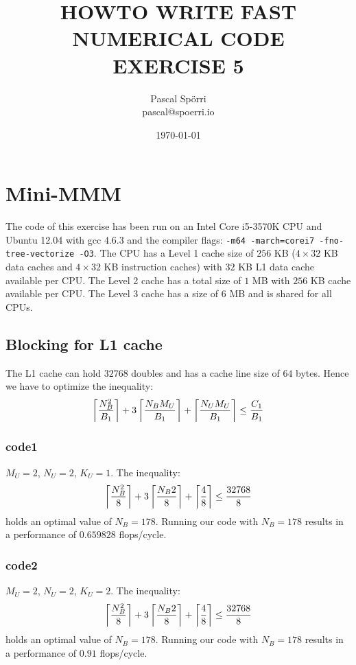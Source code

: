 \documentclass[portrait,a4paper]{article}
\begin{document}
 \author{Pascal Spörri\\pascal@spoerri.io}
 \title{HOWTO WRITE FAST NUMERICAL CODE\\ EXERCISE 5}
 \date{\today}
\maketitle

\section{Mini-MMM}
The code of this exercise has been run on an Intel Core i5-3570K CPU and Ubuntu 12.04 with gcc 4.6.3 and the compiler flags: \lstinline{-m64 -march=corei7 -fno-tree-vectorize -O3}. The CPU has a Level 1 cache size of $256$ KB ($4\times 32$ KB data caches and $4\times 32$ KB instruction caches) with $32$ KB L1 data cache available per CPU. The Level 2 cache has a total size of $1$ MB with $256$ KB cache available per CPU. The Level 3 cache has a size of $6$ MB and is shared for all CPUs.

\subsection{Blocking for L1 cache}
The L1 cache can hold $32768$ doubles and has a cache line size of $64$ bytes. Hence we have to optimize the inequality:
\begin{align*}
    \left\lceil {N_B^2 \over B_1} \right\rceil + 3\left\lceil {N_B M_U \over B_1} \right\rceil
    + \left\lceil {N_U M_U \over B_1} \right\rceil \leq {C_1 \over B_1}
\end{align*}


\subsubsection{code1}
$M_U=2$, $N_U=2$, $K_U=1$. The inequality:
\begin{align*}
    \left\lceil {N_B^2 \over 8} \right\rceil + 3\left\lceil {N_B 2 \over 8} \right\rceil
    + \left\lceil {4 \over 8} \right\rceil \leq {32768 \over 8}
\end{align*}
holds an optimal value of $N_B=178$.  Running our code with $N_B=178$ results in a performance of $0.659828$ flops/cycle.
\subsubsection{code2}
$M_U=2$, $N_U=2$, $K_U=2$. The inequality:
\begin{align*}
    \left\lceil {N_B^2 \over 8} \right\rceil + 3\left\lceil {N_B 2 \over 8} \right\rceil
    + \left\lceil {4\over 8} \right\rceil \leq {32768 \over 8}
\end{align*}
holds an optimal value of $N_B=178$. Running our code with $N_B=178$ results in a performance of $0.91$ flops/cycle.
\end{document}
